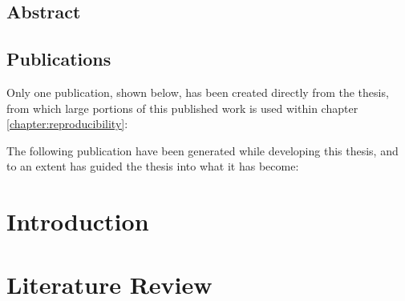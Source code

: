 \documentclass[11pt]{report}
\begin{document}
\section*{\centering Abstract}



\clearpage


\clearpage

\section*{\centering Publications}
Only one publication, shown below, has been created directly from the thesis, from which large portions of this published work is used within chapter \ref{chapter:reproducibility}:\bigskip

\noindent {}\vspace{24pt}

\noindent The following publication have been generated while developing this thesis, and to an extent has guided the thesis into what it has become:\bigskip

\noindent {}\bigskip

\noindent {}\bigskip

\noindent {}\bigskip

\noindent {}

\clearpage

\tableofcontents

\clearpage

\listoffigures

\clearpage

\listoftables



\chapter{Introduction}
\label{chapter:introduction}

\chapter{Literature Review}
\label{chapter:lit_review}

\end{document}

